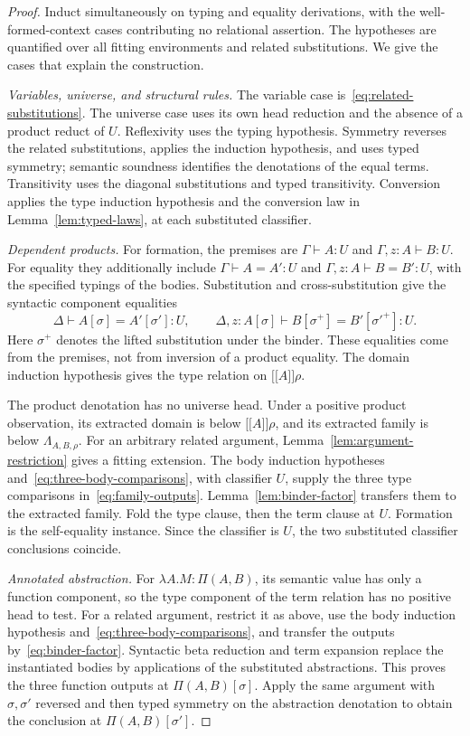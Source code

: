 \documentclass[11pt,a4paper]{article}
\theoremstyle{definition}
\theoremstyle{remark}
\newcommand{\ev}[1]{\mathopen{[\![}#1\mathclose{]\!]}}
\begin{document}
\begin{proof}
Induct simultaneously on typing and equality derivations, with the
well-formed-context cases contributing no relational assertion.
The hypotheses are quantified over all fitting environments and related
substitutions. We give the cases that explain the construction.

\smallskip\noindent\emph{Variables, universe, and structural rules.}
The variable case is~\eqref{eq:related-substitutions}. The universe case
uses its own head reduction and the absence of a product reduct of $U$.
Reflexivity uses the typing hypothesis. Symmetry reverses the related
substitutions, applies the induction hypothesis, and uses typed symmetry;
semantic soundness identifies the denotations of the equal terms.
Transitivity uses the diagonal substitutions and typed transitivity.
Conversion applies the type induction hypothesis and the conversion law
in Lemma~\ref{lem:typed-laws}, at each substituted classifier.

\smallskip\noindent\emph{Dependent products.}
For formation, the premises are $\Gamma\vdash A:U$ and
$\Gamma,z:A\vdash B:U$. For equality they additionally include
$\Gamma\vdash A=A':U$ and $\Gamma,z:A\vdash B=B':U$, with the
specified typings of the bodies. Substitution and cross-substitution
give the syntactic component equalities
\[
 \Delta\vdash A[\sigma]=A'[\sigma']:U,\qquad
 \Delta,z:A[\sigma]\vdash B[\sigma^+]=B'[\sigma'^+]:U.
\]
Here $\sigma^+$ denotes the lifted substitution under the binder.
These equalities come from the premises, not from inversion of a product
equality. The domain induction hypothesis gives the type relation on
$\ev A\rho$.

The product denotation has no universe head. Under a positive product
observation, its extracted domain is below $\ev A\rho$, and its extracted
family is below $\Lambda_{A,B,\rho}$. For an arbitrary related argument,
Lemma~\ref{lem:argument-restriction} gives a fitting extension. The body
induction hypotheses and~\eqref{eq:three-body-comparisons}, with classifier
$U$, supply the three type comparisons in~\eqref{eq:family-outputs}.
Lemma~\ref{lem:binder-factor} transfers them to the extracted family.
Fold the type clause, then the term clause at $U$. Formation is the
self-equality instance. Since the classifier is $U$, the two substituted
classifier conclusions coincide.

\smallskip\noindent\emph{Annotated abstraction.}
For $\lambda A.M:\Pi(A,B)$, its semantic value has only a function
component, so the type component of the term relation has no positive
head to test. For a related argument, restrict it as above, use the body
induction hypothesis and~\eqref{eq:three-body-comparisons}, and transfer
the outputs by~\eqref{eq:binder-factor}. Syntactic beta reduction and term
expansion replace the instantiated bodies by applications of the
substituted abstractions. This proves the three function outputs at
$\Pi(A,B)[\sigma]$. Apply the same argument with $\sigma,\sigma'$
reversed and then typed symmetry on the abstraction denotation to obtain
the conclusion at $\Pi(A,B)[\sigma']$.


\end{proof}
\end{document}
